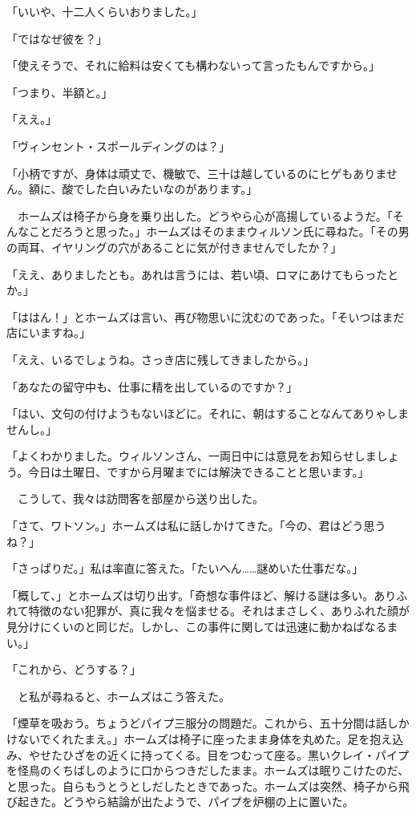 \documentclass[tate,paper=b6j,jafontsize=9pt]{jlreq}
\begin{document}
「いいや、十二人くらいおりました。」

「ではなぜ彼を？」

「使えそうで、それに給料は安くても構わないって言ったもんですから。」

「つまり、半額と。」

「ええ。」

「ヴィンセント・スポールディングのは？」

「小柄ですが、身体は頑丈で、機敏で、三十は越しているのにヒゲもありません。額に、酸でした白いみたいなのがあります。」

　ホームズは椅子から身を乗り出した。どうやら心が高揚しているようだ。「そんなことだろうと思った。」ホームズはそのままウィルソン氏に尋ねた。「その男の両耳、イヤリングの穴があることに気が付きませんでしたか？」

「ええ、ありましたとも。あれは言うには、若い頃、ロマにあけてもらったとか。」

「ははん！」とホームズは言い、再び物思いに沈むのであった。「そいつはまだ店にいますね。」

「ええ、いるでしょうね。さっき店に残してきましたから。」

「あなたの留守中も、仕事に精を出しているのですか？」

「はい、文句の付けようもないほどに。それに、朝はすることなんてありゃしませんし。」

「よくわかりました。ウィルソンさん、一両日中には意見をお知らせしましょう。今日は土曜日、ですから月曜までには解決できることと思います。」

　こうして、我々は訪問客を部屋から送り出した。

「さて、ワトソン。」ホームズは私に話しかけてきた。「今の、君はどう思うね？」

「さっぱりだ。」私は率直に答えた。「たいへん……謎めいた仕事だな。」

「概して、」とホームズは切り出す。「奇想な事件ほど、解ける謎は多い。ありふれて特徴のない犯罪が、真に我々を悩ませる。それはまさしく、ありふれた顔が見分けにくいのと同じだ。しかし、この事件に関しては迅速に動かねばなるまい。」

「これから、どうする？」

　と私が尋ねると、ホームズはこう答えた。

「煙草を吸おう。ちょうどパイプ三服分の問題だ。これから、五十分間は話しかけないでくれたまえ。」ホームズは椅子に座ったまま身体を丸めた。足を抱え込み、やせたひざをの近くに持ってくる。目をつむって座る。黒いクレイ・パイプを怪鳥のくちばしのように口からつきだしたまま。ホームズは眠りこけたのだ、と思った。自らもうとうとしだしたときであった。ホームズは突然、椅子から飛び起きた。どうやら結論が出たようで、パイプを炉棚の上に置いた。
\end{document}
